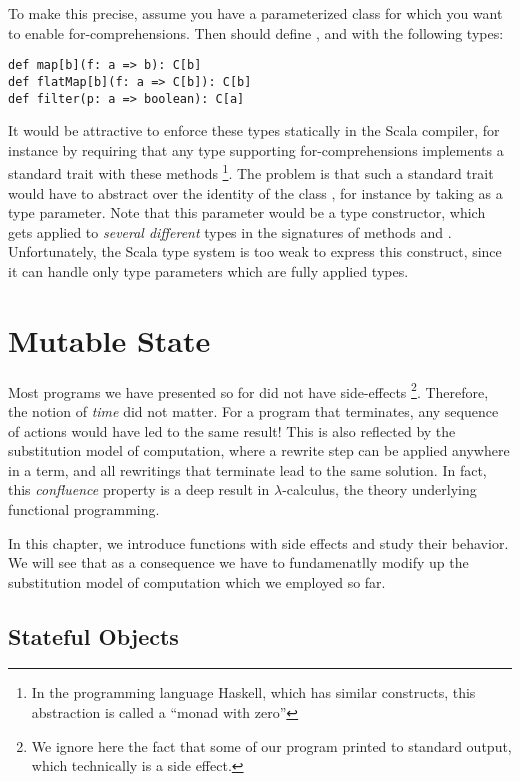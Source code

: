 {To make this precise, assume you have a parameterized class
  for which you want to enable for-comprehensions. Then
  should define ,  and 
 with the following types:
\begin{lstlisting}
def map[b](f: a => b): C[b]
def flatMap[b](f: a => C[b]): C[b]
def filter(p: a => boolean): C[a]
\end{lstlisting}
It would be attractive to enforce these types statically in the Scala
compiler, for instance by requiring that any type supporting
for-comprehensions implements a standard trait with these methods
\footnote{In the programming language Haskell, which has similar
constructs, this abstraction is called a ``monad with zero''}.  The
problem is that such a standard trait would have to abstract over the
identity of the class , for instance by taking  as a
type parameter.  Note that this parameter would be a type constructor,
which gets applied to {\em several different} types in the signatures of
methods  and . Unfortunately, the Scala type
system is too weak to express this construct, since it can handle only
type parameters which are fully applied types.

\chapter{Mutable State}

Most programs we have presented so for did not have side-effects
\footnote{We ignore here the fact that some of our program printed to
standard output, which technically is a side effect.}.  Therefore, the
notion of {\em time} did not matter.  For a program that terminates,
any sequence of actions would have led to the same result!  This is
also reflected by the substitution model of computation, where a
rewrite step can be applied anywhere in a term, and all rewritings
that terminate lead to the same solution.  In fact, this {\em
confluence} property is a deep result in $\lambda$-calculus, the
theory underlying functional programming. 

In this chapter, we introduce functions with side effects and study
their behavior. We will see that as a consequence we have to
fundamenatlly modify up the substitution model of computation which we
employed so far.

\section{Stateful Objects}

}
